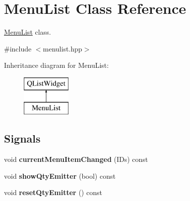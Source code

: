 \hypertarget{classMenuList}{\section{Menu\-List Class Reference}
\label{classMenuList}
}


\hyperlink{classMenuList}{Menu\-List} class.  




{\ttfamily \#include $<$menulist.\-hpp$>$}

Inheritance diagram for Menu\-List\-:\begin{figure}[H]
\begin{center}
\leavevmode
\includegraphics[height=2.000000cm]{classMenuList}
\end{center}
\end{figure}
\subsection*{Signals}
\begin{DoxyCompactItemize}
\item 
\hypertarget{classMenuList_a8eb7badea0b913bf4d3916d5b92c8f93}{void {\bfseries current\-Menu\-Item\-Changed} (I\-Ds) const }\label{classMenuList_a8eb7badea0b913bf4d3916d5b92c8f93}

\item 
\hypertarget{classMenuList_a3a1b1b0037c02a3a55a6870bd268aee6}{void {\bfseries show\-Qty\-Emitter} (bool) const }\label{classMenuList_a3a1b1b0037c02a3a55a6870bd268aee6}

\item 
\hypertarget{classMenuList_a7eb1c68ab9247e9c7c89d5a853193863}{void {\bfseries reset\-Qty\-Emitter} () const }\label{classMenuList_a7eb1c68ab9247e9c7c89d5a853193863}

\end{DoxyCompactItemize}
